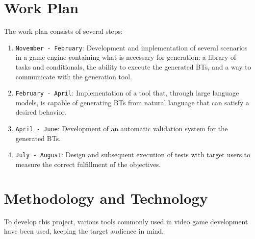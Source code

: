 \section{Work Plan}
The work plan consists of several steps:

\begin{enumerate}
	\item \texttt{November - February}: Development and implementation of several scenarios in a game engine containing what is necessary for generation: a library of tasks and conditionals, the ability to execute the generated BTs, and a way to communicate with the generation tool.
	\item \texttt{February - April}: Implementation of a tool that, through large language models, is capable of generating BTs from natural language that can satisfy a desired behavior.
	\item \texttt{April - June}: Development of an automatic validation system for the generated BTs.
	\item \texttt{July - August}: Design and subsequent execution of tests with target users to measure the correct fulfillment of the objectives.
\end{enumerate}

\section{Methodology and Technology}
To develop this project, various tools commonly used in video game development have been used, keeping the target audience in mind.

